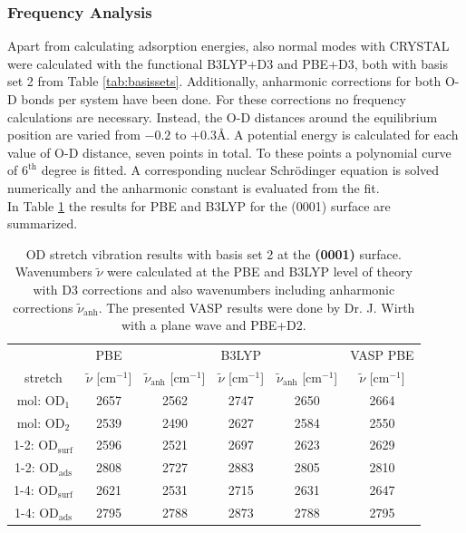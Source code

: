 \documentclass[11pt,DIV=13,BCOR=5mm,a4paper,headinclude]{scrbook}
\newcommand\todo[1]{\textcolor{red}{TODO: \textit{{#1}}}}
\begin{document}
\subsubsection{Frequency Analysis}
Apart from calculating adsorption energies, also normal modes with CRYSTAL were calculated with the functional B3LYP+D3 and PBE+D3, both with basis set 2 from Table \ref{tab:basissets}.
Additionally, anharmonic corrections for both O-D bonds per system have been done.
For these corrections no frequency calculations are necessary.
Instead, the O-D distances around the equilibrium position are varied from $-0.2$ to $+0.3$\AA{}.
A potential energy is calculated for each value of O-D distance, seven points in total.
To these points a polynomial curve of $6^\textrm{th}$ degree is fitted.
A corresponding nuclear Schrödinger equation is solved numerically and the anharmonic constant is evaluated from the fit.
\\
In Table \ref{tab:freqs_0001_crystal} the results for PBE and B3LYP for the (0001) surface are summarized.
\begin{table}[!h]
  \centering
  \caption{OD stretch vibration results with basis set 2 at the \textbf{(0001)} surface.
Wavenumbers $\tilde{\nu}$ were calculated at the PBE and B3LYP level of theory with D3 corrections and also wavenumbers including anharmonic corrections $\tilde{\nu}_\textrm{anh}$.
The presented VASP results were done by Dr. J. Wirth with a plane wave and PBE+D2.}
  \begin{tabular}{ccc|cc|c}
  \toprule
   & PBE & & B3LYP & &VASP PBE\\
  stretch & $\tilde{\nu}$ [cm$^{-1}$] &$\tilde{\nu}_\textrm{anh}$ [cm$^{-1}$] &$\tilde{\nu}$ [cm$^{-1}$] & $\tilde{\nu}_\textrm{anh}$ [cm$^{-1}$]& $\tilde{\nu}$ [cm$^{-1}$]\\\midrule
  mol: OD$_{\textrm{1}}$    &2657 &2562 &2747 &2650 & 2664\\
  mol: OD$_{\textrm{2}}$    &2539 &2490 &2627 &2584 & 2550\\
  1-2: OD$_{\textrm{surf}}$ &2596 &2521 &2697 &2623 & 2629\\%
  1-2: OD$_{\textrm{ads}}$  &2808 &2727 &2883 &2805 & 2810\\%
  1-4: OD$_{\textrm{surf}}$ &2621 &2531 &2715 &2631 & 2647\\%
  1-4: OD$_{\textrm{ads}}$  &2795 &2788 &2873 &2788 & 2795\\%
  \bottomrule
    \end{tabular}
  \label{tab:freqs_0001_crystal}
\end{table}
\end{document}
